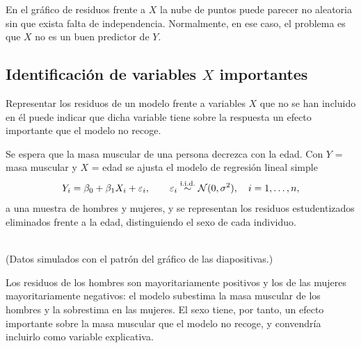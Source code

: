 En el gráfico de residuos frente a $X$ la nube de puntos puede parecer no aleatoria sin que
exista falta de independencia. Normalmente, en ese caso, el problema es que $X$ no es un buen
predictor de $Y$.

\subsection{Identificación de variables \texorpdfstring{$X$}{X} importantes}
\label{sec:t4-omitidas}

Representar los residuos de un modelo frente a variables $X$ que no se han incluido en él puede
indicar que dicha variable tiene sobre la respuesta un efecto importante que el modelo no
recoge.

\begin{ejemplo}
  Se espera que la masa muscular de una persona decrezca con la edad. Con $Y$ = masa muscular y
  $X$ = edad se ajusta el modelo de regresión lineal simple
  \[
    Y_i = \beta_0+\beta_1X_i+\varepsilon_i, \qquad \varepsilon_i\overset{\text{i.i.d.}}{\sim}\mathcal{N}(0,\sigma^2), \quad i=1,\ldots,n,
  \]
  a una muestra de hombres y mujeres, y se representan los residuos estudentizados eliminados
  frente a la edad, distinguiendo el sexo de cada individuo.
  \begin{center}
    \\
    {\footnotesize (Datos simulados con el patrón del gráfico de las diapositivas.)}
  \end{center}
  Los residuos de los hombres son mayoritariamente positivos y los de las mujeres
  mayoritariamente negativos: el modelo subestima la masa muscular de los hombres y la
  sobrestima en las mujeres. El sexo tiene, por tanto, un efecto importante sobre la masa
  muscular que el modelo no recoge, y convendría incluirlo como variable explicativa.
\end{ejemplo}

